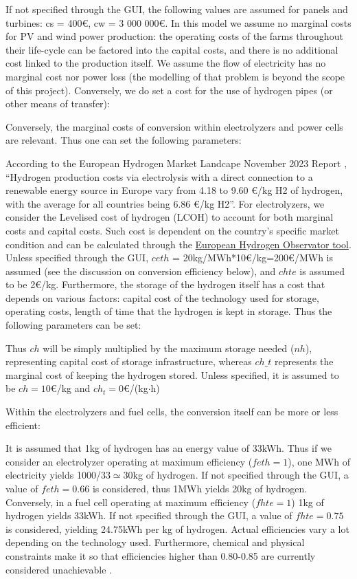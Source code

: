 If not specified through the GUI, the following values are assumed for panels and turbines: cs = 400\euro, cw = 3 000 000\euro. In this model we assume no marginal costs for PV and wind power production: the operating costs of the farms throughout their life-cycle can be factored into the capital costs, and there is no additional cost linked to the production itself. 
We assume the flow of electricity has no marginal cost nor power loss (the modelling of that problem is beyond the scope of this project). Conversely, we do set a cost for the use of hydrogen pipes (or other means of transfer):

Conversely, the marginal costs of conversion within electrolyzers and power cells are relevant. Thus one can set the following parameters:

According to the European Hydrogen Market Landcape November 2023 Report  \cite{European_H2_Market_landscape},
 ``Hydrogen production costs via electrolysis with a direct connection to a 
 renewable energy source in Europe vary from 4.18 to 9.60 €/kg H2 of hydrogen, with the average
  for all countries being 6.86 €/kg H2''. For electrolyzers, we consider the Levelised cost of hydrogen (LCOH)
   to account for both marginal costs and capital costs. Such cost is dependent on the country's specific market
    condition and can be calculated through the \href{https://observatory.clean-hydrogen.europa.eu/tools-reports/levelised-cost-hydrogen-calculator}{European Hydrogen Observator tool}. Unless specified through the GUI, $ceth$ = 20kg/MWh*10\euro/kg=200\euro/MWh is assumed (see the discussion on conversion efficiency below), and $chte$ is assumed to be 2\euro/kg. 
Furthermore, the storage of the hydrogen itself has a cost that depends on various factors: capital cost of the technology used for storage, operating costs, length of time that the hydrogen is kept in storage. Thus the following parameters can be set:

Thus $ch$ will be simply multiplied by the maximum storage needed ($nh$), representing capital
 cost of storage infrastructure, whereas $ch\_t$ represents the marginal cost of keeping the
  hydrogen stored.  Unless specified, it is assumed to be $ch=10$\euro/kg and $ch_t=0$\euro/(kg$\cdot$h)

Within the electrolyzers and fuel cells, the conversion itself can be more or less efficient:

It is assumed that 1kg of hydrogen has an energy value of 33kWh. Thus if we consider an electrolyzer operating at maximum efficiency ($feth=1$), one MWh of electricity yields 1000/33$\simeq$30kg of hydrogen. If not specified through the GUI, a value of $feth=0.66$ is considered, thus 1MWh yields 20kg of hydrogen.
Conversely, in a fuel cell operating at maximum efficiency ($fhte=1$) 1kg of hydrogen yields 
33kWh. If not specified through the GUI, a value of $fhte=0.75$ is considered, yielding 24.75kWh 
per kg of hydrogen. Actual efficiencies vary a lot depending on the technology used. Furthermore, chemical
 and physical constraints make it so that efficiencies higher than 0.80-0.85 are currently considered 
 unachievable \cite{DAWOOD}.

